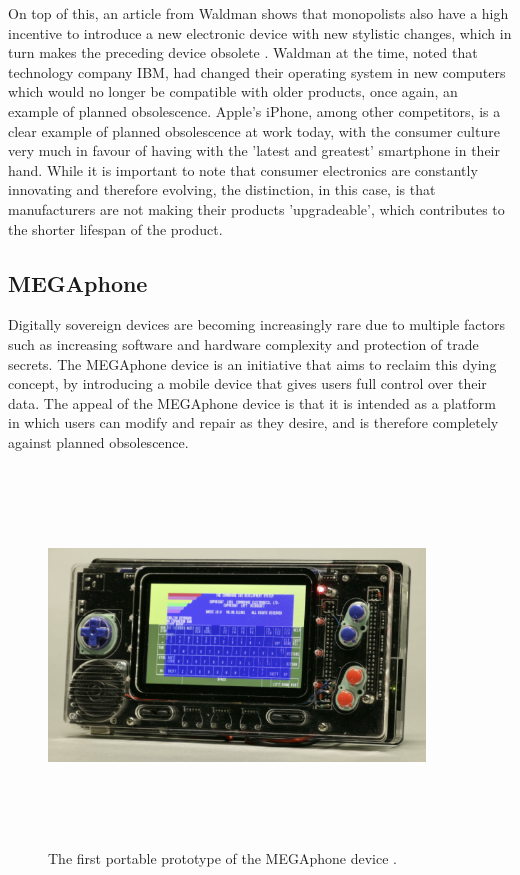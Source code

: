 On top of this, an article from Waldman shows that monopolists also have a high incentive to introduce a new electronic device with new stylistic changes, which in turn makes the preceding device obsolete \cite{obsolescence2}.
Waldman at the time, noted that technology company IBM, had changed their operating system in new computers which would no longer be compatible with older products, once again, an example of planned obsolescence.
Apple's iPhone, among other competitors, is a clear example of planned obsolescence at work today, with the consumer culture very much in favour of having with the 'latest and greatest' smartphone in their hand.
While it is important to note that consumer electronics are constantly innovating and therefore evolving, the distinction, in this case, is that manufacturers are not making their products 'upgradeable', which contributes to the shorter lifespan of the product.

\subsection{MEGAphone}

Digitally sovereign devices are becoming increasingly rare due to multiple factors such as increasing software and hardware complexity and protection of trade secrets.
The MEGAphone device is an initiative that aims to reclaim this dying concept, by introducing a mobile device that gives users full control over their data.
The appeal of the MEGAphone device is that it is intended as a platform in which users can modify and repair as they desire, and is therefore completely against planned obsolescence.

\begin{figure} [h]
    \centering
    \includegraphics[width=10cm,height=10cm,keepaspectratio]{Figures/megaphone_concept.png}
    \caption{The first portable prototype of the MEGAphone device \cite{mega65}.}
    \label{fig:MEGAphoneConcept}
\end{figure}

